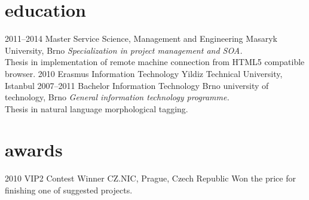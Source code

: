 \documentclass[]{friggeri-cv} %
\begin{document}

\newpage
\section{education}

\begin{entrylist}
\entry
{2011--2014}
{Master {\normalfont Service Science, Management and Engineering}}
{Masaryk University, Brno}
{\emph{Specialization in project management and SOA.} \\ Thesis in implementation of remote machine connection from HTML5 compatible browser.}
\entry
{2010}
{Erasmus {\normalfont Information Technology}}
{Yildiz Technical University, Istanbul}
{}
\entry
{2007--2011}
{Bachelor {\normalfont Information Technology}}
{Brno university of technology, Brno}
{\emph{General information technology programme.} \\ Thesis in natural language morphological tagging.}
\end{entrylist}


\section{awards}

\begin{entrylist}
\entry
{2010}
{VIP2 Contest Winner}
{CZ.NIC, Prague, Czech Republic}
{Won the price for finishing one of suggested projects.}
\end{entrylist}


\end{document}
